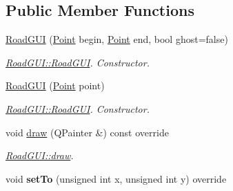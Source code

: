 \subsection*{Public Member Functions}
\begin{DoxyCompactItemize}
\item 
\hyperlink{classRoadGUI_acfdd2c56d642c80612b54f6a0fa05cc5}{Road\-G\-U\-I} (\hyperlink{classPoint}{Point} begin, \hyperlink{classPoint}{Point} end, bool ghost=false)
\begin{DoxyCompactList}\small\item\em \hyperlink{classRoadGUI_acfdd2c56d642c80612b54f6a0fa05cc5}{Road\-G\-U\-I\-::\-Road\-G\-U\-I}. Constructor. \end{DoxyCompactList}\item 
\hyperlink{classRoadGUI_af093d97dcb41ce7d13d6ca37245ab5ac}{Road\-G\-U\-I} (\hyperlink{classPoint}{Point} point)
\begin{DoxyCompactList}\small\item\em \hyperlink{classRoadGUI_acfdd2c56d642c80612b54f6a0fa05cc5}{Road\-G\-U\-I\-::\-Road\-G\-U\-I}. Constructor. \end{DoxyCompactList}\item 
void \hyperlink{classRoadGUI_a7cff0e8608cff8223f41b4a266fcb4b2}{draw} (Q\-Painter \&) const override
\begin{DoxyCompactList}\small\item\em \hyperlink{classRoadGUI_a7cff0e8608cff8223f41b4a266fcb4b2}{Road\-G\-U\-I\-::draw}. \end{DoxyCompactList}\item 
\hypertarget{classRoadGUI_aa1e823a3c4afcc07fb64b9c984eddb50}{void {\bfseries set\-To} (unsigned int x, unsigned int y) override}\label{classRoadGUI_aa1e823a3c4afcc07fb64b9c984eddb50}


\end{DoxyCompactItemize}
